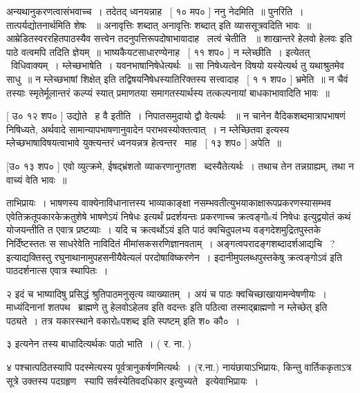 \documentclass[11pt, openany]{book}
\begin{document}
अन्यथानुकरणत्वासंभवाच्च~। तदेतद् ध्वनयन्नाह \textendash\ [ १० मप० ] ननु
नेदमिति~॥ पुनरिति~। तात्पर्यद्योतनार्थमिति शेषः ~॥ {\qt अनावृत्तिः
शब्दात् अनावृत्तिः शब्दात्} इति व्याससूत्रवदिति भावः~॥
आम्रेडितस्वररहितपाठस्यैव सत्त्वेन तदनुपत्तिरूपदोषाभावादाह \textendash\ लत्वं चेतीति
~॥ शाखान्तरे {\qt हेलवो हेलवः} इति पाठे वत्वमपि तदिति ज्ञेयम्~॥
भाष्यकैयटसाधारण्येनाह \textendash\ [ ११ शप० ] न म्लेच्छीति~। 
इत्येतत् \textendash\ विधिवाक्यम्~। म्लेच्छभाषेति~। यवनभाषानिषेधेत्यर्थः~॥ सा
निषेध्यत्वेन विषयो यस्येत्यर्थ तु यथाश्रुतमेव साधु~॥ {\qt न म्लेच्छभाषां
शिक्षेत्} इति तद्विषयनिेषेधस्यातिरिक्तस्य सत्त्वादाह \textendash\ [ १ १ शप० ]
भ्रमेति~॥ न चैवं तस्याः स्मृतेर्मूलान्तरं कल्प्यं स्यात् प्रमाणतया
समागतस्यार्थस्य तत्कल्पनायां बाधकाभावादिति भावः~॥ 

 [ उ० १२ शप० ] उद्योते \textendash\ ह वै इतीति~। निपातसमुदायो द्वौ वेत्यर्थः
~॥ न चानेन वैदिकशब्दमात्रापभाषणं निषिध्यते, अर्थवादे
सामान्यापभाषणानुवादेन पराभवस्योक्तत्वात्~। न म्लेच्छितवा इत्यस्य
म्लेच्छभाषाविषयत्वाभावे युक्त्यन्तरं ध्वनयन्नत्र हेत्वन्तर \textendash\ माह \textendash\ [ १३
शप० ] अपेति~॥ 

 [उ० १३ शप० ] एवो व्युत्क्रमे, ईषद्भ्रंशतो व्याकरणानुगतश \textendash\ 
ब्दस्यैतेत्यर्थः~। तथाच तेन तन्नग्राह्यम्, तथा न वाच्यं वेति भावः~॥ 



ताभिप्रायः~। भाषणस्य वाक्येनाविधानात्तस्य भाव्याकाङ्क्षा
नसम्भवतीत्युभयाकाक्षारूपप्रकरणस्यासम्भव एवेति{\qt क्रतूपकारकेक्रतुशेषे
भाषणेऽयं निषेधः} इत्यर्थं प्रदर्शयन्तः {\qt प्रकरणाच्च क्रत्वङ्गोsयं निषेधः}
इत्युद्वयोतं कथं योजयन्तीति त एवात्र प्रष्टव्याः~। यदि च
{\qt क्रत्वर्थोऽय}ं इति पाठं क्वचिदुपलभ्य वङ्गदेशमुद्रितपुस्तके
निर्दिंष्टस्ततः स साधरेवेति नाविदितं मीमांसकसरणिज्ञानवताम्~। 
{\qt अङ्गत्वपरादङ्गशब्दादर्शआद्यचि \textendash\ ?} इत्याद्यक्तिस्तु
रघुनाथानामुपहसनीयैवेत्यलं परदोषाविष्करणेन~। इदानीमुपलब्धपुस्तकेषु
{\qt क्रत्वङ्गोऽवं} इति पाठदर्शनात्स एवात्र स्थापितः~। 

२ इदं च भाष्यादिषु प्रसिद्धं श्रुतिपाठमनुसृत्य व्याख्यातम्~। अयं च
पाठः क्वचिच्छाखायामन्वेषणीयः~। माध्यंदिनानां शतपथ \textendash\ ब्राह्मणे तु
{\qt हेलवोऽहेलव इति वदन्तः} इति पठित्वा {\qt तस्माद्ब्राह्मणो न म्लेच्छेत्} इति
पठ्यते~। तत्र यकारस्थाने वकारोsपशब्द इति स्पष्टम् इति श० कौ०~। 

३ इत्यनेन तस्य बाधादित्यर्थकः पाठो भाति~। ( र. ना. ) 

४ पश्चात्पठितस्यापि पदस्मेत्यस्य पूर्वत्रानुकर्षणमित्यर्थः~। (र.ना.)
नायंछायाऽभिप्रायः, किन्तु वार्तिककृताऽत्र सूत्रे उक्तस्य पदग्रहृण \textendash\ 
स्यापि सर्वस्येतिवदधिकार इत्युच्यते \textendash\ इत्येवाभिप्रायः~। 
\end{document}
